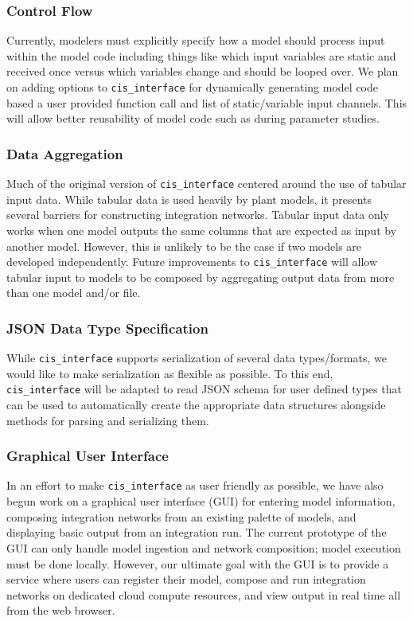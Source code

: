 \documentclass[journal]{IEEEtran}
\newcommand{\todo}[1]{{\color{red}{#1}}}
\newcommand{\cis}{{\tt cis\_interface}{}}
\begin{document}
\subsubsection{Control Flow}\label{SS:control}
%
Currently, modelers must explicitly specify how a model should process input 
within the model code including things like which input variables are static 
and received once versus which variables change and should be looped over. 
We plan on adding options to {\cis} for dynamically generating model code 
based a user provided function call and list of static/variable input channels. 
This will allow better reusability of model code such as during parameter studies.

\subsubsection{Data Aggregation}\label{SS:dataagg}
%
Much of the original version of {\cis} centered around the use of 
tabular input data. While tabular data is used heavily by plant models, it 
presents several barriers for constructing integration networks. Tabular input 
data only works when one model outputs the same columns that are expected as 
input by another model. However, this is unlikely to be the case if two models 
are developed independently. Future improvements to {\cis} will allow 
tabular input to models to be composed by aggregating output data from more than 
one model and/or file.

\subsubsection{JSON Data Type Specification}\label{SS:json}
%
While {\cis} supports serialization of several data types/formats, we 
would like to make serialization as flexible as possible. To this end, 
{\cis} will be adapted to read JSON schema \citep{jsonschema} for user defined types that 
can be used to automatically create the appropriate data structures alongside
methods for parsing and serializing them.

\subsubsection{Graphical User Interface}\label{SS:gui}
%
In an effort to make {\cis} as user friendly as possible, we have also begun work on a graphical user interface (GUI) for entering model information, composing integration networks from an existing palette of models, and displaying basic output from an integration run. The current prototype of the GUI can only handle model ingestion and network composition; model execution must be done locally. However, our ultimate goal with the GUI is to provide a service where users can register their model, compose and run integration networks on dedicated cloud compute resources, and view output in real time all from the web browser. 
\end{document}
